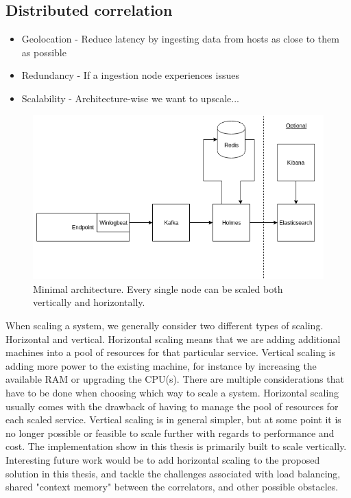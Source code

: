 \subsection{Distributed correlation}
\label{sub:distributed-correlation}

\begin{itemize}
    \item Geolocation - Reduce latency by ingesting data from hosts as close to them as possible
    \item Redundancy - If a ingestion node experiences issues
    \item Scalability - Architecture-wise we want to upscale...
\end{itemize}

\begin{figure}[ht]  %
  \centering
  \includegraphics[width=.85\textwidth]{figures/holmes-architecture}
  \caption[An example figure.]{Minimal architecture. Every single node can be scaled both vertically and horizontally.}
  \label{fig:example}
\end{figure}
When scaling a system, we generally consider two different types of scaling. Horizontal and vertical. Horizontal scaling means that we are adding additional machines into a pool of resources for that particular service. Vertical scaling is adding more power to the existing machine, for instance by increasing the available RAM or upgrading the CPU(s).
There are multiple considerations that have to be done when choosing which way to scale a system. Horizontal scaling usually comes with the drawback of having to manage the pool of resources for each scaled service. Vertical scaling is in general simpler, but at some point it is no longer possible or feasible to scale further with regards to performance and cost.
The implementation show in this thesis is primarily built to scale vertically.
Interesting future work would be to add horizontal scaling to the proposed solution in this thesis, and tackle the challenges associated with load balancing, shared "context memory" between the correlators, and other possible obstacles.


